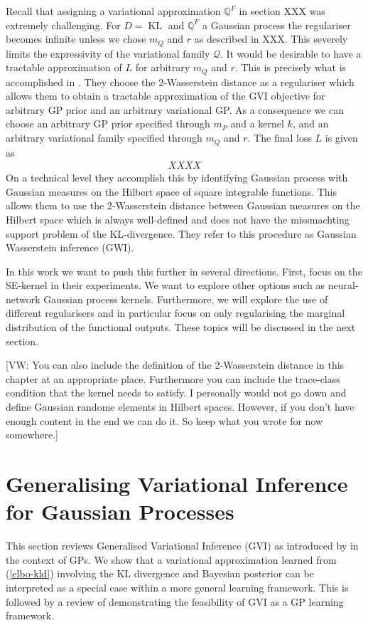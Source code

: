 \documentclass{article}
\newcommand{\vw}[1]{{\color{green} [VW: #1]}}
\newcommand{\bbQ}{\mathbb{Q}}
\newcommand{\calQ}{\mathcal{Q}}
\newcommand{\KL}{\operatorname{KL}}
\numberwithin{equation}{section}
\begin{document}
Recall that assigning a variational approximation $\bbQ^F$ in section XXX was extremely challenging. For $D= \KL$ and $\bbQ^F$ a Gaussian process the regulariser becomes infinite unless we chose $m_Q$ and $r$ as described in XXX. This severely limits the expressivity of the variational family $\calQ$. It would be desirable to have a tractable approximation of $L$ for arbitrary $m_Q$ and $r$. This is precisely what is accomplished in \citet{wild2022generalized}. They choose the $2$-Wasserstein distance as a regulariser which allows them to obtain a tractable approximation of the GVI objective for arbitrary GP prior and an arbitrary variational GP. As a consequence we can choose an arbitrary GP prior specified through $m_P$ and a kernel $k$, and an arbitrary variational family specified through $m_Q$ and $r$. The final loss $L$ is given as 
\begin{align}
    XXXX
\end{align}
On a technical level they accomplish this by identifying Gaussian process with Gaussian measures on the Hilbert space of square integrable functions. This allows them to use the 2-Wasserstein distance between Gaussian measures on the Hilbert space which is always well-defined and does not have the missmachting support problem of the KL-divergence. They refer to this procedure as Gaussian Wasserstein inference (GWI). 

In this work we want to push this further in several directions. First, \citet{wild2022generalized} focus on the SE-kernel in their experiments. We want to explore other options such as neural-network Gaussian process kernels. Furthermore, we will explore the use of different regularisers and in particular focus on only regularising the marginal distribution of the functional outputs. These topics will be discussed in the next section.

\vw{You can also include the definition of the 2-Wasserstein distance in this chapter at an appropriate place. Furthermore you can include the trace-class condition that the kernel needs to satisfy. I personally would not go down and define Gaussian randome elements in Hilbert spaces. However, if you don't have enough content in the end we can do it. So keep what you wrote for now somewhere.}



\section{Generalising Variational Inference for Gaussian Processes}
This section reviews Generalised Variational Inference (GVI) as introduced by \cite{knoblauch2022optimization} in the context of GPs. We show that a variational approximation learned from (\ref{elbo-kld}) involving the KL divergence and Bayesian posterior can be interpreted as a special case within a more general learning framework. This is followed by a review of \cite{wild2022generalized} demonstrating the feasibility of GVI as a GP learning framework.
\end{document}
